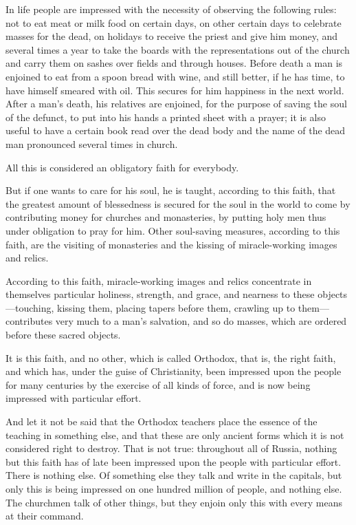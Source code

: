 \documentclass{book}
\begin{document}
In life people are impressed with the necessity of observing the following rules: not to eat meat or milk food on certain days, on other certain days to celebrate masses for the dead, on holidays to receive the priest and give him money, and several times a year to take the boards with the representations out of the church and carry them on sashes over fields and through houses. Before death a man is enjoined to eat from a spoon bread with wine, and still better, if he has time, to have himself smeared with oil. This secures for him happiness in the next world. After a man’s death, his relatives are enjoined, for the purpose of saving the soul of the defunct, to put into his hands a printed sheet with a prayer; it is also useful to have a certain book read over the dead body and the name of the dead man pronounced several times in church.

All this is considered an obligatory faith for everybody.

But if one wants to care for his soul, he is taught, according to this faith, that the greatest amount of blessedness is secured for the soul in the world to come by contributing money for churches and monasteries, by putting holy men thus under obligation to pray for him. Other soul-saving measures, according to this faith, are the visiting of monasteries and the kissing of miracle-working images and relics.

According to this faith, miracle-working images and relics concentrate in themselves particular holiness, strength, and grace, and nearness to these objects—touching, kissing them, placing tapers before them, crawling up to them—contributes very much to a man’s salvation, and so do masses, which are ordered before these sacred objects.

It is this faith, and no other, which is called Orthodox, that is, the right faith, and which has, under the guise of Christianity, been impressed upon the people for many centuries by the exercise of all kinds of force, and is now being impressed with particular effort.

And let it not be said that the Orthodox teachers place the essence of the teaching in something else, and that these are only ancient forms which it is not considered right to destroy. That is not true: throughout all of Russia, nothing but this faith has of late been impressed upon the people with particular effort. There is nothing else. Of something else they talk and write in the capitals, but only this is being impressed on one hundred million of people, and nothing else. The churchmen talk of other things, but they enjoin only this with every means at their command.
\end{document}
